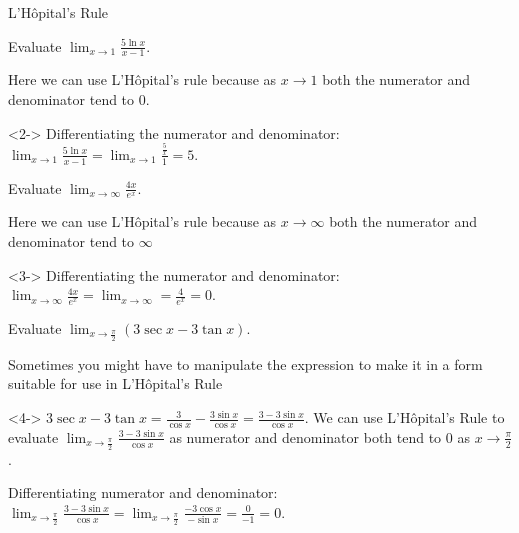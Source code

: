 \documentclass[8pt]{beamer}
\begin{document}
\begin{frame}[shrink=20]{L'H\^opital's Rule}
	\begin{problem}
		Evaluate $\lim_{x \to 1} \frac{5\ln x}{x-1}$.
	\end{problem}
	\alert{Here we can use L'H\^opital's rule because as $x \to 1$ both the numerator and denominator tend to 0.}
	\begin{solution}<2->
		Differentiating the numerator and denominator: $\lim_{x \to 1} \frac{5\ln x}{x-1}= \lim_{x \to 1} \frac{\frac{5}{x}}{1}=5 $.
	\end{solution}
	\begin{problem}
		Evaluate $\lim_{x \to \infty} \frac{4x}{e^x} $.
	\end{problem}
	\alert{Here we can use L'H\^opital's rule because as $x\to \infty$ both the numerator and denominator tend to $\infty$}
	\begin{solution}<3->
		Differentiating the numerator and denominator: $\lim_{x \to \infty} \frac{4x}{e^x}= \lim_{x \to \infty} = \frac{4}{e^x}=0  $.
	\end{solution}
	\begin{problem}
		Evaluate $\lim_{x \to \frac{\pi}{2}}(3\sec x - 3 \tan x) $.
	\end{problem}
	\alert{Sometimes you might have to manipulate the expression to make it in a form suitable for use in L'H\^opital's Rule}
	\begin{solution}<4->
		$3\sec x - 3 \tan x = \frac{3}{\cos x}- \frac{3 \sin x }{\cos x}=\frac{3-3\sin x}{\cos x}$.
		We can use L'H\^opital's Rule to evaluate $\lim_{x \to \frac{\pi}{2}} \frac{3-3\sin x}{\cos x}$ as numerator and denominator both tend to 0 as $x \to \frac{\pi}{2}$.

		Differentiating numerator and denominator: $\lim_{x \to \frac{\pi}{2}} \frac{3-3\sin x}{\cos x}= \lim_{x \to \frac{\pi}{2}} \frac{-3\cos x }{-\sin x}=\frac{0}{-1}=0$.
	\end{solution}
\end{frame}
\end{document}

